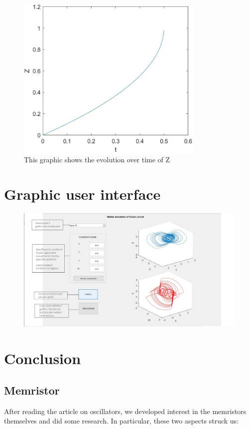 \documentclass[12pt, a4paper]{paper}
\begin{document}
\begin{figure}[h]
\centering
\includegraphics[width=0.8\textwidth]{Fig__36.eps}
\caption{This graphic shows the evolution over time of Z}
\end{figure}

\newpage
\section{Graphic user interface}
\begin{figure}[h]
\centering
\includegraphics[width=1.3\textwidth]{gui_2.eps}
\end{figure}

\newpage
\section{Conclusion}
\subsection{Memristor}
After reading the article on oscillators, we  developed interest in the memristors themselves and did some research.  In particular, these two aspects struck us:
\end{document}

